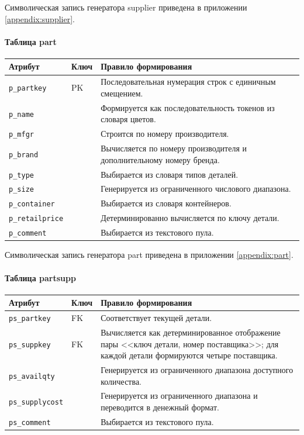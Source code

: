 \noindent Символическая запись генератора supplier приведена в
приложении \ref{appendix:supplier}.

\paragraph{Таблица part}
\begin{center}
\small
\begin{tabular}{|p{}|p{}|p{}|}
\hline
\textbf{Атрибут} & \textbf{Ключ} & \textbf{Правило формирования} \\
\hline
\texttt{p\_partkey} & PK & Последовательная нумерация строк с единичным смещением. \\
\hline
\texttt{p\_name} &  & Формируется как последовательность токенов из словаря цветов. \\
\hline
\texttt{p\_mfgr} &  & Строится по номеру производителя. \\
\hline
\texttt{p\_brand} &  & Вычисляется по номеру производителя и дополнительному номеру бренда. \\
\hline
\texttt{p\_type} &  & Выбирается из словаря типов деталей. \\
\hline
\texttt{p\_size} &  & Генерируется из ограниченного числового диапазона. \\
\hline
\texttt{p\_container} &  & Выбирается из словаря контейнеров. \\
\hline
\texttt{p\_retailprice} &  & Детерминированно вычисляется по ключу детали. \\
\hline
\texttt{p\_comment} &  & Выбирается из текстового пула. \\
\hline
\end{tabular}
\end{center}

\noindent Символическая запись генератора part приведена в
приложении \ref{appendix:part}.

\paragraph{Таблица partsupp}
\begin{center}
\small
\begin{tabular}{|p{}|p{}|p{}|}
\hline
\textbf{Атрибут} & \textbf{Ключ} & \textbf{Правило формирования} \\
\hline
\texttt{ps\_partkey} & FK & Соответствует текущей детали. \\
\hline
\texttt{ps\_suppkey} & FK & Вычисляется как детерминированное отображение пары <<ключ детали, номер поставщика>>; для каждой детали формируются четыре поставщика. \\
\hline
\texttt{ps\_availqty} &  & Генерируется из ограниченного диапазона доступного количества. \\
\hline
\texttt{ps\_supplycost} &  & Генерируется из ограниченного диапазона и переводится в денежный формат. \\
\hline
\texttt{ps\_comment} &  & Выбирается из текстового пула. \\
\hline
\end{tabular}
\end{center}

